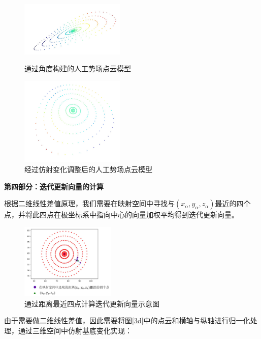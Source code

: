 \documentclass{my_paper}
\begin{document}
\begin{figure}[htbp]
    \centering
    \begin{minipage}[t]{0.48\textwidth}
        \centering
        \includegraphics[width=5cm]{3d.jpg}
        \caption{通过角度构建的人工势场点云模型}
        \label{3d}
    \end{minipage}
    \begin{minipage}[t]{0.48\textwidth}
        \centering
        \includegraphics[width=5cm]{3dn.jpg}
        \caption{经过仿射变化调整后的人工势场点云模型}
        \label{3dn}
    \end{minipage}
\end{figure}

\textbf{第四部分：迭代更新向量的计算}

根据二维线性差值原理，我们需要在映射空间中寻找与$(x_{\alpha}, y_{\alpha}, z_{\alpha})$最近的四个点，并将此四点在极坐标系中指向中心的向量加权平均得到迭代更新向量。

\begin{figure}[h]
    \centering
    \includegraphics[width=0.4\textwidth]{sigedian.jpg}
    \caption{通过距离最近四点计算迭代更新向量示意图}
    \label{sigedian}
\end{figure}

由于需要做二维线性差值，因此需要将图\ref{3d}中的点云和横轴与纵轴进行归一化处理，通过三维空间中仿射基底变化实现：
\end{document}

